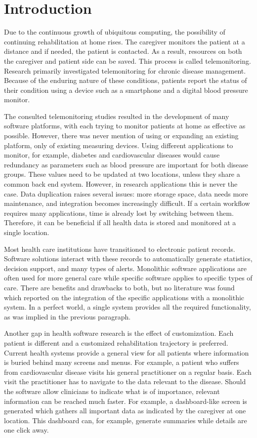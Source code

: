 \section{Introduction}

Due to the continuous growth of ubiquitous computing, the possibility of continuing rehabilitation at home rises. The caregiver monitors the patient at a distance and if needed, the patient is contacted. As a result, resources on both the caregiver and patient side can be saved. This process is called telemonitoring. Research primarily investigated telemonitoring for chronic disease management. Because of the enduring nature of these conditions, patients report the status of their condition using a device such as a smartphone and a digital blood pressure monitor.

The consulted telemonitoring studies resulted in the development of many software platforms, with each trying to monitor patients at home as effective as possible. However, there was never mention of using or expanding an existing platform, only of existing measuring devices. Using different applications to monitor, for example, diabetes and cardiovascular diseases would cause redundancy as parameters such as blood pressure are important for both disease groups. These values need to be updated at two locations, unless they share a common back end system. However, in research applications this is never the case. Data duplication raises several issues: more storage space, data needs more maintenance, and integration becomes increasingly difficult. If a certain workflow requires many applications, time is already lost by switching between them. Therefore, it can be beneficial if all health data is stored and monitored at a single location.

Most health care institutions have transitioned to electronic patient records. Software solutions interact with these records to automatically generate statistics, decision support, and many types of alerts. Monolithic software applications are often used for more general care while specific software applies to specific types of care. There are benefits and drawbacks to both, but no literature was found which reported on the integration of the specific applications with a monolithic system. In a perfect world, a single system provides all the required functionality, as was implied in the previous paragraph.

Another gap in health software research is the effect of customization. Each patient is different and a customized rehabilitation trajectory is preferred. Current health systems provide a general view for all patients where information is buried behind many screens and menus. For example, a patient who suffers from cardiovascular disease visits his general practitioner on a regular basis. Each visit the practitioner has to navigate to the data relevant to the disease. Should the software allow clinicians to indicate what is of importance, relevant information can be reached much faster. For example, a dashboard-like screen is generated which gathers all important data as indicated by the caregiver at one location. This dashboard can, for example, generate summaries while details are one click away. 

